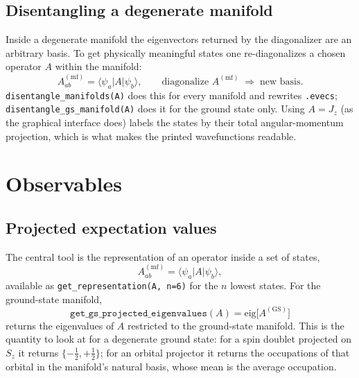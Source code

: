 \documentclass[11pt,a4paper]{article}
\newcommand{\op}[1]{\texttt{#1}}
\begin{document}
\subsection{Disentangling a degenerate manifold}

Inside a degenerate manifold the eigenvectors returned by the diagonalizer are
an arbitrary basis.  To get physically meaningful states one re-diagonalizes a
chosen operator $A$ within the manifold:
\begin{equation}
  A^{(\mathrm{mf})}_{ab} = \langle \psi_a | A | \psi_b\rangle ,
  \qquad \text{diagonalize } A^{(\mathrm{mf})}
  \;\Rightarrow\; \text{new basis}.
\end{equation}
\op{disentangle\_manifolds(A)} does this for every manifold and rewrites
\op{.evecs}; \op{disentangle\_gs\_manifold(A)} does it for the ground state
only.  Using $A=J_z$ (as the graphical interface does) labels the states by
their total angular-momentum projection, which is what makes the printed
wavefunctions readable.

\section{Observables}

\subsection{Projected expectation values}

The central tool is the representation of an operator inside a set of states,
\begin{equation}
  A^{(\mathrm{mf})}_{ab} = \langle \psi_a | A | \psi_b\rangle ,
\end{equation}
available as \op{get\_representation(A, n=6)} for the $n$ lowest states.  For
the ground-state manifold,
\begin{equation}
  \op{get\_gs\_projected\_eigenvalues}(A)
  = \mathrm{eig}\big[A^{(\mathrm{GS})}\big]
\end{equation}
returns the eigenvalues of $A$ restricted to the ground-state manifold.  This is
the quantity to look at for a degenerate ground state: for a spin doublet
projected on $S_z$ it returns $\{-\tfrac12,+\tfrac12\}$; for an orbital
projector it returns the occupations of that orbital in the manifold's natural
basis, whose mean is the average occupation.
\end{document}
